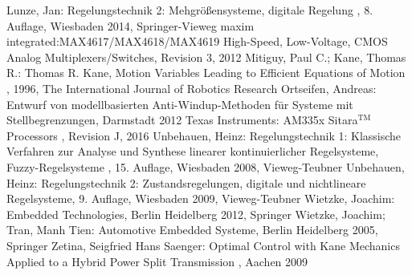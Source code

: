 \begin{thebibliography}{999}
 Lunze, Jan: \glqq Regelungstechnik 2: Mehgrößensysteme, digitale Regelung \grqq , 8. Auflage, Wiesbaden 2014, Springer-Vieweg
 maxim integrated:\glqq MAX4617/MAX4618/MAX4619 High-Speed, Low-Voltage, CMOS Analog Multiplexers/Switches\grqq, Revision 3, 2012
 Mitiguy, Paul C.; Kane, Thomas R.: Thomas R. Kane, \glqq Motion Variables Leading to Efficient Equations of Motion \grqq , 1996, The International Journal of Robotics Research
 Ortseifen, Andreas: \glqq Entwurf von modellbasierten Anti-Windup-Methoden für Systeme mit Stellbegrenzungen\grqq, Darmstadt 2012
 Texas Instruments: \glqq AM335x Sitara$^{\text{TM}}$ Processors \grqq, Revision J, 2016
 Unbehauen, Heinz: \glqq Regelungstechnik 1: Klassische Verfahren zur Analyse und Synthese linearer kontinuierlicher Regelsysteme, Fuzzy-Regelsysteme \grqq , 15. Auflage, Wiesbaden 2008, Vieweg-Teubner
 Unbehauen, Heinz: \glqq Regelungstechnik 2: Zustandsregelungen, digitale und nichtlineare Regelsysteme\grqq , 9. Auflage, Wiesbaden 2009, Vieweg-Teubner
 Wietzke, Joachim: \glqq Embedded Technologies\grqq , Berlin Heidelberg 2012, Springer
 Wietzke, Joachim; Tran, Manh Tien: \glqq Automotive Embedded Systeme\grqq , Berlin Heidelberg 2005, Springer
 Zetina, Seigfried Hans Saenger: \glqq Optimal Control with Kane Mechanics Applied to a Hybrid Power Split Transmission \grqq , Aachen 2009



\end{thebibliography}